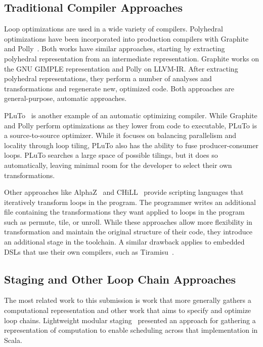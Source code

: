 \subsection{Traditional Compiler Approaches}

Loop optimizations are used in a wide variety of compilers.
Polyhedral optimizations have been incorporated into production compilers with Graphite~\cite{trifunovic2010graphite} and Polly~\cite{grosser2011polly}.
Both works have similar approaches, starting by extracting polyhedral representation from an intermediate representation. 
Graphite works on the GNU GIMPLE representation and Polly on LLVM-IR.
After extracting polyhedral representations, they perform a number of analyses and transformations and regenerate new, optimized code.
Both approaches are general-purpose, automatic approaches.

PLuTo~\cite{bondhugula2008pluto} is another example of an automatic optimizing compiler. 
While Graphite and Polly perform optimizations as they lower from code to executable, PLuTo is a source-to-source optimizer. 
While it focuses on balancing parallelism and locality through loop tiling, PLuTo also has the ability to fuse producer-consumer loops. 
PLuTo searches a large space of possible tilings, but it does so automatically, leaving minimal room for the developer to select their own transformations.

Other approaches like AlphaZ~\cite{yuki2012alphaz} and CHiLL~\cite{tiwari2009scalable} provide scripting languages that iteratively transform loops in the program. 
The programmer writes an additional file containing the transformations they want applied to loops in the program such as permute, tile, or unroll. 
While these approaches allow more flexibility in transformation and maintain the original structure of their code, they introduce an additional stage in the toolchain.
A similar drawback applies to embedded DSLs that use their own compilers, such as Tiramisu~\cite{baghdadi2019tiramisu}.




\subsection{Staging and Other Loop Chain Approaches}

The most related work to this submission is work that more generally gathers
a computational representation and other work that aims to specify and
optimize loop chains.
Lightweight modular staging~\cite{LMS2012} presented an approach for gathering 
a representation of computation to enable scheduling across that implementation
in Scala.

